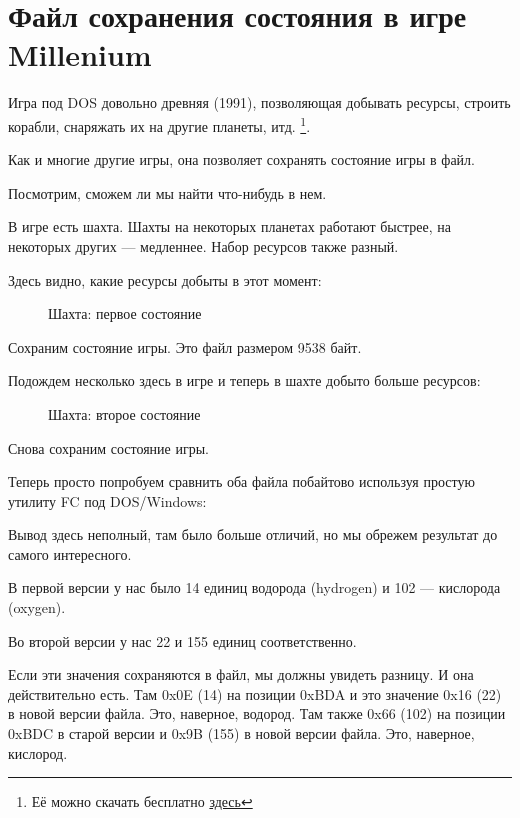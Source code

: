 ﻿\section{Файл сохранения состояния в игре Millenium}
\label{Millenium_DOS_game}

Игра  под DOS довольно древняя (1991), позволяющая
добывать ресурсы, строить корабли, снаряжать их на другие планеты, итд.
\footnote{Её можно скачать бесплатно
\href{http://go.yurichev.com/17316}{здесь}}.

Как и многие другие игры, она позволяет сохранять состояние игры в файл.

Посмотрим, сможем ли мы найти что-нибудь в нем.

\clearpage
В игре есть шахта.
Шахты на некоторых планетах работают быстрее, на некоторых других --- медленнее. 
Набор ресурсов также разный.

Здесь видно, какие ресурсы добыты в этот момент: 

\begin{figure}[H]
\centering
{}
\caption{Шахта: первое состояние}
\label{fig:mill_1}
\end{figure}

Сохраним состояние игры.
Это файл размером 9538 байт.

Подождем несколько  здесь в игре и теперь в шахте добыто больше ресурсов:

\begin{figure}[H]
\centering
{}
\caption{Шахта: второе состояние}
\label{fig:mill_2}
\end{figure}

Снова сохраним состояние игры.

Теперь просто попробуем сравнить оба файла побайтово используя простую утилиту FC под DOS/Windows:



Вывод здесь неполный, там было больше отличий, но мы обрежем результат до самого интересного.

В первой версии у нас было 14 единиц водорода (hydrogen) и 102 --- кислорода (oxygen).

Во второй версии у нас 22 и 155 единиц соответственно.

Если эти значения сохраняются в файл, мы должны увидеть разницу.
И она действительно есть. 
Там 0x0E (14) на позиции 0xBDA и это значение 0x16 (22) в новой версии файла.
Это, наверное, водород.
Там также 0x66 (102) на позиции 0xBDC в старой версии и 0x9B (155) в новой версии файла. 
Это, наверное, кислород.

